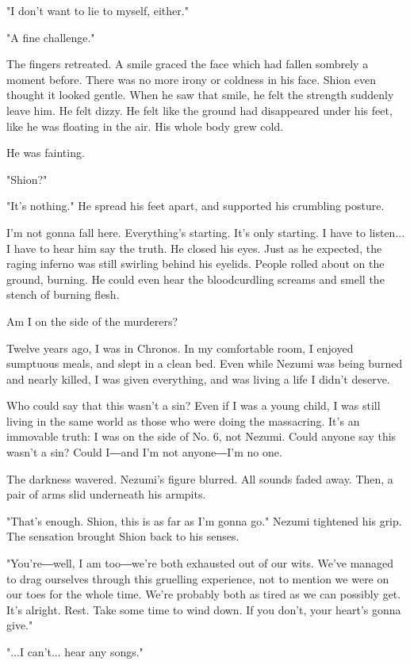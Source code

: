 "I don't want to lie to myself, either."

"A fine challenge."

The fingers retreated. A smile graced the face which had fallen sombrely
a moment before. There was no more irony or coldness in his face. Shion
even thought it looked gentle. When he saw that smile, he felt the
strength suddenly leave him. He felt dizzy. He felt like the ground had
disappeared under his feet, like he was floating in the air. His whole
body grew cold.

He was fainting.

"Shion?"

"It's nothing." He spread his feet apart, and supported his crumbling
posture.

I'm not gonna fall here. Everything's starting. It's only starting. I
have to listen... I have to hear him say the truth. He closed his eyes.
Just as he expected, the raging inferno was still swirling behind his
eyelids. People rolled about on the ground, burning. He could even hear
the bloodcurdling screams and smell the stench of burning flesh.

Am I on the side of the murderers?

Twelve years ago, I was in Chronos. In my comfortable room, I enjoyed
sumptuous meals, and slept in a clean bed. Even while Nezumi was being
burned and nearly killed, I was given everything, and was living a life
I didn't deserve.

Who could say that this wasn't a sin? Even if I was a young child, I was
still living in the same world as those who were doing the massacring.
It's an immovable truth: I was on the side of No. 6, not Nezumi. Could
anyone say this wasn't a sin? Could I―and I'm not anyone―I'm no one.

The darkness wavered. Nezumi's figure blurred. All sounds faded away.
Then, a pair of arms slid underneath his armpits.

"That's enough. Shion, this is as far as I'm gonna go." Nezumi tightened
his grip. The sensation brought Shion back to his senses.

"You're―well, I am too―we're both exhausted out of our wits. We've
managed to drag ourselves through this gruelling experience, not to
mention we were on our toes for the whole time. We're probably both as
tired as we can possibly get. It's alright. Rest. Take some time to wind
down. If you don't, your heart's gonna give."

"...I can't... hear any songs."

